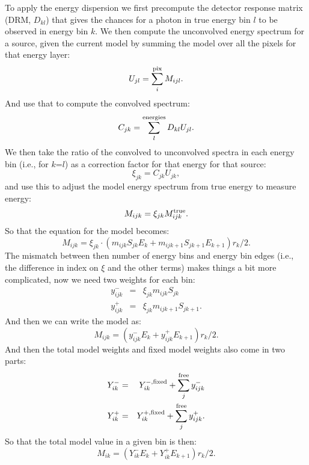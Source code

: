 \documentclass[preprint]{aastex}
\begin{document}
To apply the energy dispersion we first precompute the detector response matrix (DRM, $D_{kl}$) 
that gives the chances for a photon in true energy bin $l$ to be observed in energy bin $k$.
We then compute the unconvolved energy spectrum for a source,
given the current model by summing the model over all the pixels for that energy layer:
\begin{equation}
  U_{jl} = \sum_i^{\rm pix} M_{ijl}.
\end{equation}
And use that to compute the convolved spectrum:
\begin{equation}
  C_{jk} = \sum_l^{\rm energies} D_{kl} U_{jl}.
\end{equation}
We then take the ratio of the convolved to unconvolved spectra in each energy bin (i.e., 
for $k$=$l$) as a correction factor for that energy for that source:
\begin{equation}
  \xi_{jk} = C_{jk} U_{jk},
\end{equation}
and use this to adjust the model energy spectrum from true energy to measure energy:
\begin{equation}
  M_{ijk} = \xi_{jk} M_{ijk}^{\rm true}.
\end{equation}
So that the equation for the model becomes:
\begin{equation}
  M_{ijk} = \xi_{jk} \cdot (m_{ijk} S_{jk} E_k +  m_{ijk+1} S_{jk+1} E_{k+1}) r_k / 2.
\end{equation}
The mismatch between then number of energy bins and energy bin edges (i.e., the difference in index
on $\xi$ and the other terms) makes things a bit more complicated, now we need
two weights for each bin:
\begin{eqnarray}
  y_{ijk}^{-} & = & \xi_{jk} m_{ijk} S_{jk} \nonumber \\
  y_{ijk}^{+} & = & \xi_{jk} m_{ijk+1} S_{jk+1}.
\end{eqnarray}
And then we can write the model as:
\begin{equation}
  M_{ijk} = ( y_{ijk}^{-} E_k + y_{ijk}^{+} E_{k+1} ) r_k / 2.
\end{equation}
And then the total model weights and fixed model weights also come in two parts:
\begin{eqnarray}
  Y_{ik}^{-} & = & Y_{ik}^{-,\rm fixed} + \sum_j^{\rm free} y_{ijk}^{-} \nonumber \\
  Y_{ik}^{+} & = & Y_{ik}^{+,\rm fixed} + \sum_j^{\rm free} y_{ijk}^{+}.
\end{eqnarray}
So that the total model value in a given bin is then:
\begin{equation}
  M_{ik} = ( Y_{ik}^{-} E_k + Y_{ik}^{+} E_{k+1} ) r_k / 2.
\end{equation}
\end{document}
